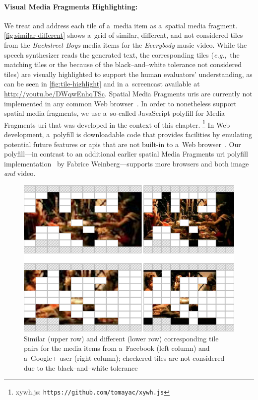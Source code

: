 \paragraph{Visual Media Fragments Highlighting:}

We treat and address each tile of a~media item
as a~spatial media fragment. \autoref{fig:similar-different}
shows a~grid of similar, different, and not considered tiles
from the \emph{Backstreet Boys} media items for the \emph{Everybody} music video.
While the speech synthesizer reads the generated text,
the corresponding tiles (\emph{e.g.},~the matching tiles
or the because of the black--and--white tolerance not considered tiles)
are visually highlighted to support the human evaluators' understanding,
as can be seen in \autoref{fig:tile-highlight}
and in a~screencast available at \url{http://youtu.be/DWqwEnhqTSc}.
Spatial Media Fragments {\sc uri}s are currently not implemented
in any common Web browser~\cite{weinberg2013polyfill}.
In order to nonetheless support spatial media fragments,
we use a~so-called JavaScript polyfill for Media Fragments {\sc uri}
that was developed in the context of this chapter.%
\footnote{xywh.js: \texttt{https://github.com/tomayac/xywh.js}}
In Web development, a~polyfill is downloadable code that provides facilities
by emulating potential future features or {\sc api}s
that are not built-in to a~Web browser~\cite{sharp2010polyfill}.
Our polyfill---in contrast to an additional earlier
spatial Media Fragments {\sc uri} polyfill implementation~\cite{weinberg2013polyfill}
by Fabrice Weinberg---supports more browsers and both image \emph{and} video.

\begin{figure}[t!]
  \centering
  \includegraphics[width=0.75\linewidth]{./similar-different.png}
  \caption{Similar (upper row) and different (lower row) corresponding tile pairs for the media items from a~Facebook (left column) and a~Google+ user (right column); checkered tiles are not considered due to the black--and--white tolerance}
  \label{fig:similar-different}
\end{figure}

